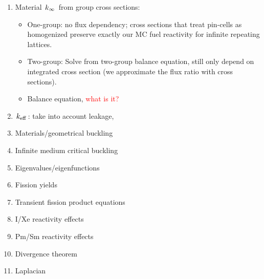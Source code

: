 \documentclass{school-22.211-notes}
\date{April 12, 2012}
\begin{document}
\maketitle

\begin{enumerate}
\item Material $\left. k_{\infty} \right.$ from group cross sections: 
  \begin{itemize}
  \item One-group: no flux dependency; cross sections that treat pin-cells as homogenized preserve exactly our MC fuel reactivity for infinite repeating lattices. 
  \item Two-group: Solve from two-group balance equation, still only depend on integrated cross section (we approximate the flux ratio with cross sections). 
  \item Balance equation, \textcolor{red}{what is it?} 
  \end{itemize}
\item $\left. k_{\mathrm{eff}} \right.$: take into account leakage,
\item Materials/geometrical buckling
\item Infinite medium critical buckling
\item Eigenvalues/eigenfunctions
\item Fission yields
\item Transient fission product equations
\item I/Xe reactivity effects
\item Pm/Sm reactivity effects
\item Divergence theorem
\item Laplacian 
\end{enumerate}
\end{document}
